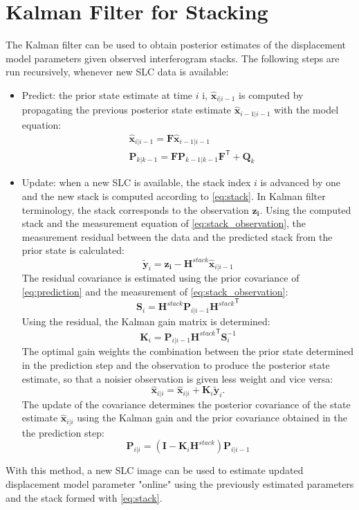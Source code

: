 \documentclass{article}
\newcommand\state[3]{{#1}_{#2\vert#3}}
\begin{document}
\section{Kalman Filter for Stacking}
The Kalman filter can be used to obtain posterior estimates of the displacement model parameters given  observed interferogram stacks. The following steps are run recursively, whenever new SLC data is available:
\begin{itemize}
	\item Predict: the prior state estimate at time $i$ i, $\state{\mathbf{\hat{x}}}{i}{i-1}$ is computed by propagating the  previous posterior state estimate $\state{\mathbf{\hat{x}}}{i-1}{i-1}$ with the model equation:
	\begin{align}\label{eq:prediction}
		&\state{\mathbf{\hat{x}}}{i}{i-1} = \mathbf{F} \state{\mathbf{\hat{x}}}{i-1}{i-1}\\
		&\state{\mathbf{P}}{k}{k-1} = \mathbf{F} \state{\mathbf{P}}{k-1}{k-1} \mathbf{F}^\mathsf{T} + \mathbf{Q}_{k}
	\end{align}
	\item Update: when a new SLC is available, the stack index $i$ is advanced by one and the new stack is computed according to \autoref{eq:stack}. In Kalman filter terminology, the stack corresponds to the observation $\mathbf{z_i}$. Using the computed stack and the measurement equation of \autoref{eq:stack_observation}, the measurement residual  between the data and the predicted stack from the prior state is calculated:
	\begin{equation}
		\tilde{\mathbf{y}}_i = \mathbf{z_i} - \mathbf{H}^{stack} \state{\mathbf{\hat{x}}}{i}{i-1}
	\end{equation}
	The residual covariance is estimated using the prior covariance of \autoref{eq:prediction}  and the measurement of \autoref{eq:stack_observation}:
	\begin{equation}
		\mathbf{S}_i = \mathbf{H}^{stack} \state{\mathbf{P}}{i}{i-1}{\mathbf{H}^{stack}}^\mathsf{T}
	\end{equation}
	Using the residual, the Kalman gain matrix is determined:
	\begin{equation}
		\mathbf{K}_i = \state{\mathbf{P}}{i}{i-1}{\mathbf{H}^{stack}}^\mathsf{T}\mathbf{S}_i^{-1}
	\end{equation}
	The optimal gain weights the  combination between the prior state determined in the prediction step and the observation to produce the posterior state estimate, so that 
	a noisier observation is given less weight and vice versa:
	\begin{equation}
		\state{\mathbf{\hat{x}}}{i}{i} = \state{\mathbf{\hat{x}}}{i}{i} + \mathbf{K}_i \tilde{\mathbf{y}}_i.
	\end{equation}
	The update of the covariance determines the posterior covariance of the state estimate $\state{\mathbf{\hat{x}}}{i}{i}$ using the Kalman gain and the prior covariance obtained in the the prediction step:
	\begin{equation}
	\state{\mathbf{P}}{i}{i} = \left(\mathbf{I} - \mathbf{K}_i\mathbf{H}^{stack}\right)\state{\mathbf{P}}{i}{i-1}
	\end{equation}
\end{itemize}
With this method, a new SLC image can be used to estimate updated displacement model parameter "online" using the previously estimated parameters and the stack formed with \autoref{eq:stack}.
\end{document}
